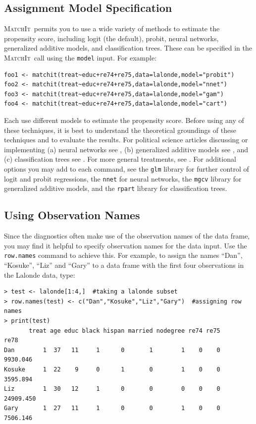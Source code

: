 \documentclass[oneside,letterpaper,titlepage]{article}
\newcommand{\MatchIt}{\textsc{MatchIt}}
\begin{document}
\subsection{Assignment Model Specification}

\MatchIt\ permits you to use a wide variety of methods to estimate the
propensity score, including logit (the default), probit, neural
networks, generalized additive models, and classification trees.
These can be specified in the \MatchIt\ call using the \texttt{model}
input.  For example:

\begin{verbatim}
foo1 <- matchit(treat~educ+re74+re75,data=lalonde,model="probit")
foo2 <- matchit(treat~educ+re74+re75,data=lalonde,model="nnet")
foo3 <- matchit(treat~educ+re74+re75,data=lalonde,model="gam")
foo4 <- matchit(treat~educ+re74+re75,data=lalonde,model="cart")
\end{verbatim}

Each use different models to estimate the propensity score.  Before
using any of these techniques, it is best to understand the
theoretical groundings of these techniques and to evaluate the
results.  For political science articles discussing or implementing
(a) neural networks see
\citet{BecKinZen00,Zeng99,Zeng00,KinZen02,LagRus02}, (b) generalized
additive models see \citet{BecJac98}, and (c) classification trees see
\citet{RugKimMar03}.  For more general treatments, see
\citet{Bishop95,White92,BreFriOls84}.  For additional options you may
add to each command, see the \texttt{glm} library for further control
of logit and probit regressions, the \texttt{nnet} for neural
networks, the \texttt{mgcv} library for generalized additive models,
and the \texttt{rpart} library for classification trees.

\subsection{Using Observation Names}
\label{rnames}

Since the diagnostics often make use of the observation names of the
data frame, you may find it helpful to specify observation names for the
data input.  Use the \texttt{row.names} command to achieve this.  For
example, to assign the names ``Dan'', ``Kosuke'', ``Liz'' and ``Gary''
to a data frame with the first four observations in the Lalonde data,
type:

\begin{verbatim}
> test <- lalonde[1:4,]  #taking a lalonde subset
> row.names(test) <- c("Dan","Kosuke","Liz","Gary")  #assigning row names
> print(test)
       treat age educ black hispan married nodegree re74 re75      re78
Dan        1  37   11     1      0       1        1    0    0  9930.046
Kosuke     1  22    9     0      1       0        1    0    0  3595.894
Liz        1  30   12     1      0       0        0    0    0 24909.450
Gary       1  27   11     1      0       0        1    0    0  7506.146
\end{verbatim} 
\end{document}
